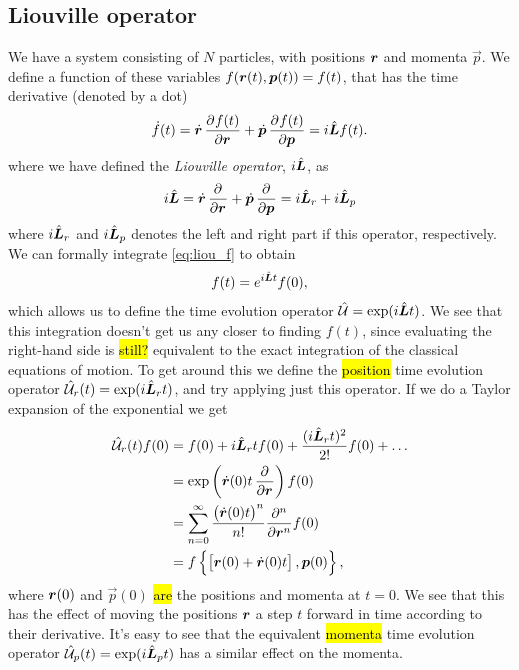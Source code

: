 \subsection{Liouville operator}


We have a system consisting of $N$ particles, with positions $\boldsymbol{r}$ and momenta $\vec p$. We define a function of these variables $f(\boldsymbol{r}(t), \boldsymbol{p}(t)) = f(t)$, that has the time derivative %
(denoted by a dot)
\begin{align}
    \dot f(t) = \dot \rvec \dpd{f(t)}{\rvec} + \dot {\vec p} \dpd{f(t)}{\vec p} = \Liou f(t).
    \label{eq:liou_f}
\end{align}
where we have defined the \emph{Liouville operator}, $i\hat{\boldsymbol{L}}$, as
\begin{align*}
    \Liou = \dot \rvec \dpd{}{\rvec} + \dot {\vec p} \dpd{}{\vec p} = \Liou_r + \Liou_p
\end{align*}
where $i\hat{\boldsymbol{L}}_r$ and $i\hat{\boldsymbol{L}}_p$ denotes the left and right part if this operator, respectively. %
We can formally integrate \cref{eq:liou_f} to obtain
\begin{align}
    f(t) = e^{i\hat{\boldsymbol{L}} t} f(0),
    \label{eq:liou_integrate}
\end{align}
which allows us to define the time evolution operator $\hat{\mathcal{U}} = \exp(i\hat{\boldsymbol{L}} t)$. We see that this integration doesn't get us any closer to finding $f(t)$, since evaluating the right-hand side is \hl{still?} equivalent to the exact integration of the classical equations of motion. To get around this we define the \hl{position} time evolution operator $\hat{\mathcal{U}}_r(t) = \exp(i\hat{\boldsymbol{L}}_r t)$, and try applying just this operator. If we do a Taylor expansion of the exponential we get
\begin{align*}
    \Lop_r(t)f(0)
    &= f(0) + \Liou_r t f(0) + \frac{(\Liou_r t)^2}{2!} f(0) + \dots \\
    &= \exp\left( \dot\rvec (0) t \dpd{}{\rvec} \right) f(0) \\
    &= \sum_{n=0}^\infty \frac{ \big(\dot\rvec(0) t\big)^n}{n!} \frac{\partial^n}{\partial \rvec^n} f(0) \\
    &= f\left\{ \left[ \rvec(0) + \dot\rvec(0)t \right], \vec p(0) \right\},
\end{align*}
where $\boldsymbol{r}(0)$ and $\vec p(0)$ \hl{are} the positions and momenta at $t = 0$. We see that this has the effect of moving the positions $\boldsymbol{r}$ a step $t$ forward in time according to their derivative. It's easy to see that the equivalent \hl{momenta} time evolution operator $\hat{\mathcal{U}}_p(t) = \exp(i\hat{\boldsymbol{L}}_p t)$ has a similar effect on the momenta. 

